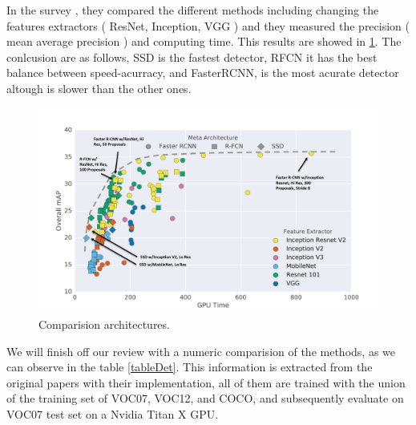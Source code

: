 \documentclass[12pt, a4paper, titlepage,twoside,openright]{article}
\begin{document}
%		
%
%
%
%




In the survey \cite{cnnComparision}, they compared the different methods including changing the features extractors ( ResNet, Inception, VGG ) and they measured the precision ( mean average precision ) and computing time. This results are showed in \ref{comparisio}. The conlcusion are as follows, SSD is the fastest detector, RFCN it has the best balance between speed-acurracy, and FasterRCNN, is the most acurate detector altough is slower than the other ones.



\begin{figure}[H]
\centering         
\includegraphics[width=0.9\linewidth]{objectDetection/comparisionTensor.png}
\caption{Comparision architectures.} \label{comparisio}
\end{figure}

We will finish off our review with a numeric comparision of the methods, as we can observe in the table \ref{tableDet}. This information is extracted from the original papers with their implementation, all of them are trained with the union of the training set of VOC07, VOC12, and COCO, and subsequently evaluate on VOC07 test set on a Nvidia Titan X GPU.   
\end{document}
